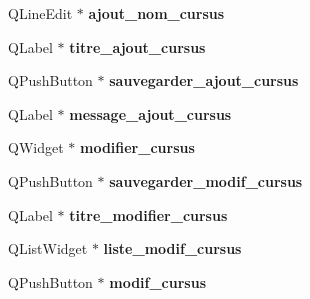 \begin{DoxyCompactItemize}
\item 
\hypertarget{class_ui___administration_a557b89e0972518b29d2eca7d528e4151}{Q\+Line\+Edit $\ast$ {\bfseries ajout\+\_\+nom\+\_\+cursus}}\label{class_ui___administration_a557b89e0972518b29d2eca7d528e4151}

\item 
\hypertarget{class_ui___administration_a41aa24074bf25c487bfaedbef09a400c}{Q\+Label $\ast$ {\bfseries titre\+\_\+ajout\+\_\+cursus}}\label{class_ui___administration_a41aa24074bf25c487bfaedbef09a400c}

\item 
\hypertarget{class_ui___administration_a7e75303acba10842394da307cafd7002}{Q\+Push\+Button $\ast$ {\bfseries sauvegarder\+\_\+ajout\+\_\+cursus}}\label{class_ui___administration_a7e75303acba10842394da307cafd7002}

\item 
\hypertarget{class_ui___administration_a97d8722878234a7f1f3e3efb385717ab}{Q\+Label $\ast$ {\bfseries message\+\_\+ajout\+\_\+cursus}}\label{class_ui___administration_a97d8722878234a7f1f3e3efb385717ab}

\item 
\hypertarget{class_ui___administration_abf21d8e989043ad46cb368672cea0cba}{Q\+Widget $\ast$ {\bfseries modifier\+\_\+cursus}}\label{class_ui___administration_abf21d8e989043ad46cb368672cea0cba}

\item 
\hypertarget{class_ui___administration_ae03cde2cb418ea5dcbb2dfa9c2376fcc}{Q\+Push\+Button $\ast$ {\bfseries sauvegarder\+\_\+modif\+\_\+cursus}}\label{class_ui___administration_ae03cde2cb418ea5dcbb2dfa9c2376fcc}

\item 
\hypertarget{class_ui___administration_a12a3f0d4c3992b20ddc85c5bfa746281}{Q\+Label $\ast$ {\bfseries titre\+\_\+modifier\+\_\+cursus}}\label{class_ui___administration_a12a3f0d4c3992b20ddc85c5bfa746281}

\item 
\hypertarget{class_ui___administration_a34a1d2b548a7beb0a894f6814b74614a}{Q\+List\+Widget $\ast$ {\bfseries liste\+\_\+modif\+\_\+cursus}}\label{class_ui___administration_a34a1d2b548a7beb0a894f6814b74614a}

\item 
\hypertarget{class_ui___administration_a59a345b28f8429d707820eb5f218c69b}{Q\+Push\+Button $\ast$ {\bfseries modif\+\_\+cursus}}\label{class_ui___administration_a59a345b28f8429d707820eb5f218c69b}


\end{DoxyCompactItemize}
